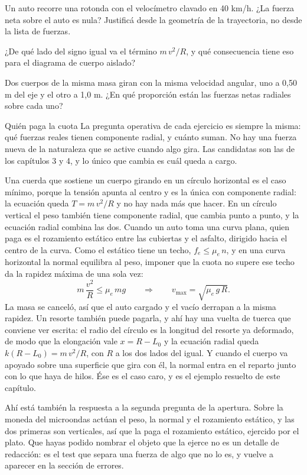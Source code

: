 \documentclass[11pt,openany]{book}
\begin{document}
\begin{chequeo}
\item Un auto recorre una rotonda con el velocímetro clavado en 40 km/h. ¿La fuerza neta sobre el auto es nula? Justificá desde la geometría de la trayectoria, no desde la lista de fuerzas.
\item ¿De qué lado del signo igual va el término $m\,v^2/R$, y qué consecuencia tiene eso para el diagrama de cuerpo aislado?
\item Dos cuerpos de la misma masa giran con la misma velocidad angular, uno a 0,50 m del eje y el otro a 1,0 m. ¿En qué proporción están las fuerzas netas radiales sobre cada uno?
\end{chequeo}

\begin{bloque}{Quién paga la cuota}
La pregunta operativa de cada ejercicio es siempre la misma: qué fuerzas reales tienen componente radial, y cuánto suman. No hay una fuerza nueva de la naturaleza que se active cuando algo gira. Las candidatas son las de los capítulos 3 y 4, y lo único que cambia es cuál queda a cargo.

Una cuerda que sostiene un cuerpo girando en un círculo horizontal es el caso mínimo, porque la tensión apunta al centro y es la única con componente radial: la ecuación queda $T = m\,v^2/R$ y no hay nada más que hacer. En un círculo vertical el peso también tiene componente radial, que cambia punto a punto, y la ecuación radial combina las dos. Cuando un auto toma una curva plana, quien paga es el rozamiento estático entre las cubiertas y el asfalto, dirigido hacia el centro de la curva. Como el estático tiene un techo, $f_e \leq \mu_e\,n$, y en una curva horizontal la normal equilibra al peso, imponer que la cuota no supere ese techo da la rapidez máxima de una sola vez:
\[
m\,\frac{v^2}{R} \leq \mu_e\, m g
\qquad\Longrightarrow\qquad
v_{\max} = \sqrt{\mu_e\, g\, R} .
\]
La masa se canceló, así que el auto cargado y el vacío derrapan a la misma rapidez. Un resorte también puede pagarla, y ahí hay una vuelta de tuerca que conviene ver escrita: el radio del círculo es la longitud del resorte ya deformado, de modo que la elongación vale $x = R - L_0$ y la ecuación radial queda $k(R-L_0) = m\,v^2/R$, con $R$ a los dos lados del igual. Y cuando el cuerpo va apoyado sobre una superficie que gira con él, la normal entra en el reparto junto con lo que haya de hilos. Ése es el caso caro, y es el ejemplo resuelto de este capítulo.

Ahí está también la respuesta a la segunda pregunta de la apertura. Sobre la moneda del microondas actúan el peso, la normal y el rozamiento estático, y las dos primeras son verticales, así que la paga el rozamiento estático, ejercido por el plato. Que hayas podido nombrar el objeto que la ejerce no es un detalle de redacción: es el test que separa una fuerza de algo que no lo es, y vuelve a aparecer en la sección de errores.


\end{bloque}
\end{document}
